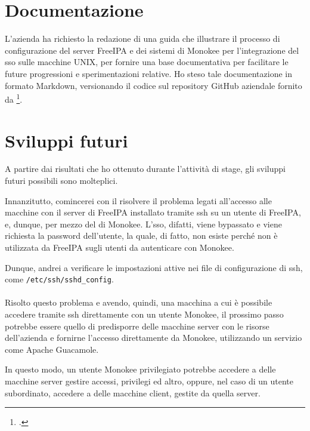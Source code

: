\section{Documentazione}

L'azienda ha richiesto la redazione di una guida che illustrare il processo di configurazione del server FreeIPA e dei sistemi di Monokee per l'integrazione del \acrshort{sso} sulle macchine UNIX, per fornire una base documentativa per facilitare le future progressioni e sperimentazioni relative. Ho steso tale documentazione in formato Markdown, versionando il codice sul repository GitHub aziendale fornito da \myAzienda\footcite{site:docs}.
\section{Sviluppi futuri}
A partire dai risultati che ho ottenuto durante l'attività di stage, gli sviluppi futuri possibili sono molteplici.

Innanzitutto, comincerei con il risolvere il problema legati all'accesso alle macchine con il server di FreeIPA installato tramite \acrshort{ssh} su un utente di FreeIPA, e, dunque, per mezzo del  di Monokee. L'\acrshort{sso}, difatti, viene bypassato e viene richiesta la password dell'utente, la quale, di fatto, non esiste perché non è utilizzata da FreeIPA sugli utenti da autenticare con Monokee. 

Dunque, andrei a verificare le impostazioni attive nei file di configurazione di \acrshort{ssh}, come \texttt{/etc/ssh/sshd\_config}.
\\ \\
Risolto questo problema e avendo, quindi, una macchina a cui è possibile accedere tramite \acrshort{ssh} direttamente con un utente Monokee, il prossimo passo potrebbe essere quello di predisporre delle macchine server con le risorse dell'azienda e fornirne l'accesso 
direttamente da Monokee, utilizzando un servizio come Apache Guacamole.

In questo modo, un utente Monokee privilegiato potrebbe accedere a delle macchine server gestire accessi, privilegi ed altro, oppure, nel caso di un utente subordinato, accedere a delle macchine client, gestite da quella server.